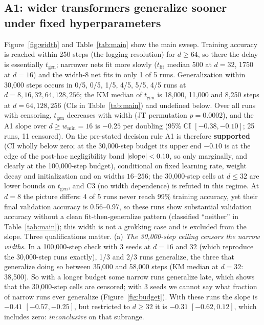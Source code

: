 \documentclass{article}
\newcommand{\tfit}{t_{\mathrm{fit}}}
\newcommand{\tgen}{t_{\mathrm{gen}}}
\begin{document}
\subsection{A1: wider transformers generalize sooner under fixed hyperparameters}
\label{sec:a1}
Figure~\ref{fig:width} and Table~\ref{tab:main} show the main sweep.
Training accuracy is reached within 250 steps (the logging resolution) for $d\ge64$, so there the delay is essentially $\tgen$; narrower nets fit more slowly ($\tfit$ median 500 at $d=32$, 1750 at $d=16$) and the width-8 net fits in only 1 of 5 runs.
Generalization within 30{,}000 steps occurs in 0/5, 0/5, 1/5, 4/5, 5/5, 4/5 runs at $d=8,16,32,64,128,256$; the KM median of $\tgen$ is 18{,}000, 11{,}000 and 8{,}250 steps at $d=64,128,256$ (CIs in Table~\ref{tab:main}) and undefined below.
Over all runs with censoring, $\tgen$ decreases with width (JT permutation $p=0.0002$), and the A1 slope over $d\ge w_{\min}=16$ is $-0.25$ per doubling (95\% CI $[-0.38,-0.10]$; 25 runs, 11 censored).
On the pre-stated decision rule A1 is therefore \textbf{supported} (CI wholly below zero; at the 30{,}000-step budget its upper end $-0.10$ is at the edge of the post-hoc negligibility band $|{\rm slope}|<0.10$, so only marginally, and clearly at the 100{,}000-step budget), conditional on fixed learning rate, weight decay and initialization and on widths $16$--$256$; the 30{,}000-step cells at $d\le32$ are lower bounds on $\tgen$, and C3 (no width dependence) is refuted in this regime.
At $d=8$ the picture differs: 4 of 5 runs never reach 99\% training accuracy, yet their final validation accuracy is 0.56--0.97, so these runs show substantial validation accuracy without a clean fit-then-generalize pattern (classified ``neither'' in Table~\ref{tab:main}); this width is not a grokking case and is excluded from the slope.
Three qualifications matter.
(a) \emph{The 30{,}000-step ceiling censors the narrow widths.} In a 100{,}000-step check with 3 seeds at $d=16$ and $32$ (which reproduce the 30{,}000-step runs exactly), 1/3 and 2/3 runs generalize, the three that generalize doing so between 35{,}000 and 58{,}000 steps (KM median at $d=32$: 38{,}500). So with a longer budget some narrow runs generalize late, which shows that the 30{,}000-step cells are censored; with 3 seeds we cannot say what fraction of narrow runs ever generalize (Figure~\ref{fig:budget}). With these runs the slope is $-0.41$ $[-0.57,-0.25]$, but restricted to $d\ge32$ it is $-0.31$ $[-0.62,0.12]$, which includes zero: \emph{inconclusive} on that subrange.
\end{document}
